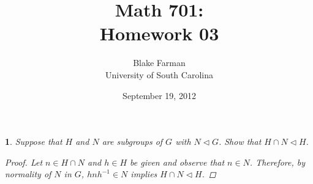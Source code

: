 \documentclass[10pt]{amsart}
\author{Blake Farman\\University of South Carolina}
\title{Math 701:\\Homework 03}
\date{September 19, 2012}
\begin{document}
\maketitle

\newcommand{\Inn}[1]{\operatorname{Inn}\left(#1\right)}
\newcommand{\Aut}[1]{\operatorname{Aut}\left(#1\right)}
\newcommand{\cntr}[1]{\mathbf{Z}\left(#1\right)}
\newcommand{\abs}[1]{\left| #1 \right|}
\newcommand{\SL}[2]{\operatorname{SL}_#1\left(#2\right)}
\newcommand{\Mat}[2]{\operatorname{Mat}_{#1}\left(#2\right)}
\renewcommand{\qedsymbol}{\ensuremath{\blacksquare}}

\newtheorem{thm}{}
\newtheorem{lem}{Lemma}

\begin{thm}
  Suppose that $H$ and $N$ are subgroups of $G$ with $N \lhd G$.
  Show that $H \cap N \lhd H$.
  \begin{proof}
    Let $n \in H \cap N$ and $h \in H$ be given and observe that $n \in N$.
    Therefore, by normality of $N$ in $G$, $hnh^{-1} \in N$ implies $H \cap N \lhd H$.
  \end{proof}
\end{thm}
\end{document}
